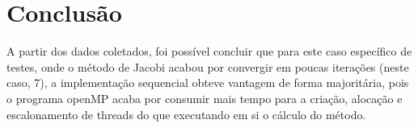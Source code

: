 \documentclass{article}
\begin{document}
\section{Conclusão}

A partir dos dados coletados, foi possível concluir que para este caso específico de testes, onde o método de Jacobi acabou por convergir em poucas iterações (neste caso, 7), a implementação sequencial obteve vantagem de forma majoritária, pois o programa openMP acaba por consumir mais tempo para a criação, alocação e escalonamento de threads do que executando em si o cálculo do método. 
\end{document}
